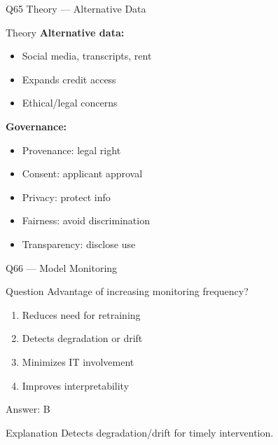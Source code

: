 \documentclass[aspectratio=169,8pt]{beamer}
\begin{document}
	\begin{frame}{Q65 Theory --- Alternative Data}
		\begin{block}{Theory}
			\textbf{Alternative data:}
			\begin{itemize}
				\item Social media, transcripts, rent
				\item Expands credit access
				\item Ethical/legal concerns
			\end{itemize}
			\textbf{Governance:}
			\begin{itemize}
				\item Provenance: legal right
				\item Consent: applicant approval
				\item Privacy: protect info
				\item Fairness: avoid discrimination
				\item Transparency: disclose use
			\end{itemize}
		\end{block}
	\end{frame}
	
	\begin{frame}{Q66 --- Model Monitoring}
		\begin{block}{Question}
			Advantage of increasing monitoring frequency?
		\end{block}
		\begin{enumerate}[label=\Alph*.]
			\item Reduces need for retraining
			\item Detects degradation or drift
			\item Minimizes IT involvement
			\item Improves interpretability
		\end{enumerate}
		\begin{exampleblock}{Answer: B}
		\end{exampleblock}
		\begin{block}{Explanation}
			Detects degradation/drift for timely intervention.
		\end{block}
	\end{frame}
	
\end{document}
